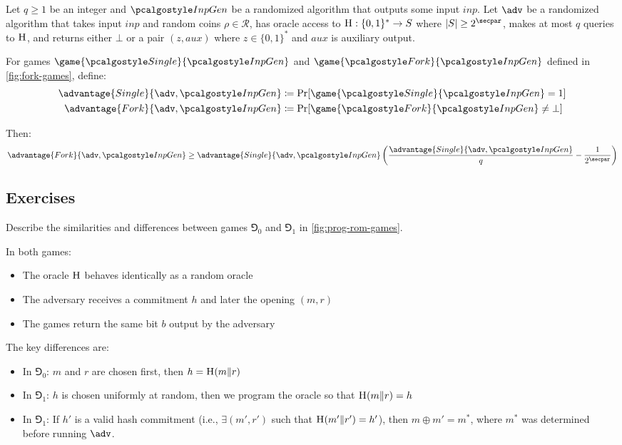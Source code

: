 \begin{lemma}\label{lem:fork}
  Let $q \geq 1$ be an integer and $\algo{InpGen}$ be a randomized algorithm that outputs some input $\mathit{inp}$.
  Let $\adv$ be a randomized algorithm that takes input $\mathit{inp}$ and random coins $\rho \in \mathcal{R}$, has oracle access to ${\normalfont\textsc{H}}: \{0,1\}^* \rightarrow S$ where $|S| \geq 2^\secpar$, makes at most $q$ queries to ${\normalfont\textsc{H}}$, and returns either $\bot$ or a pair $(z, \mathit{aux})$ where $z \in \{0,1\}^*$ and $\mathit{aux}$ is auxiliary output.
  
  For games $\game{\algo{Single}}{\algo{InpGen}}$ and $\game{\algo{Fork}}{\algo{InpGen}}$ defined in \autoref{fig:fork-games}, define:
  \begin{align*}
    \advantage{Single}{\adv, \algo{InpGen}} &\defeq \Pr[\game{\algo{Single}}{\algo{InpGen}} = 1] \\
    \advantage{Fork}{\adv, \algo{InpGen}} &\defeq \Pr[\game{\algo{Fork}}{\algo{InpGen}} \neq \bot]
  \end{align*}
  
  Then:
  \[
  \advantage{Fork}{\adv, \algo{InpGen}} \geq \advantage{Single}{\adv, \algo{InpGen}} \left( \frac{\advantage{Single}{\adv, \algo{InpGen}}}{q} - \frac{1}{2^\secpar} \right)
  \]
\end{lemma}

\subsection{Exercises}

\begin{exercise}
  Describe the similarities and differences between games $\Game_0$ and $\Game_1$ in \autoref{fig:prog-rom-games}.
\end{exercise}

\ifsolutions
\begin{mysolution}
  In both games:
  \begin{itemize}
    \item The oracle ${\normalfont\textsc{H}}$ behaves identically as a random oracle
    \item The adversary receives a commitment $h$ and later the opening $(m, r)$
    \item The games return the same bit $b$ output by the adversary
  \end{itemize}
  
  The key differences are:
  \begin{itemize}
    \item In $\Game_0$: $m$ and $r$ are chosen first, then $h = {\normalfont\textsc{H}}(m \| r)$
    \item In $\Game_1$: $h$ is chosen uniformly at random, then we program the oracle so that ${\normalfont\textsc{H}}(m \| r) = h$
    \item In $\Game_1$: If $h'$ is a valid hash commitment (i.e., $\exists (m', r')$ such that ${\normalfont\textsc{H}}(m' \| r') = h'$), then $m \oplus m' = m^*$, where $m^*$ was determined before running $\adv$.
  \end{itemize}
\end{mysolution}
\fi

